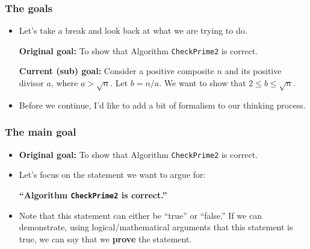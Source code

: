\begin{frame}\frametitle{The goals}
  \begin{itemize}
  \item Let's take a break and look back at what we are trying to do.
    \pause

    \begin{tcolorbox}
      {\bf Original goal:} To show that Algorithm {\tt CheckPrime2} is
      correct.
    \end{tcolorbox}
    \pause
    
    \begin{tcolorbox}
      {\bf Current (sub) goal:} Consider a positive composite $n$ and
      its positive divisor $a$, where $a>\sqrt{n}$.  Let $b=n/a$.  We
      want to show that $2\leq b\leq\sqrt{n}$.
    \end{tcolorbox}
    \pause

  \item Before we continue, I'd like to add a bit of formalism to our
    thinking process.
  \end{itemize}
\end{frame}

\begin{frame}\frametitle{The main goal}
  \begin{itemize}
  \item {\bf Original goal:} To show that Algorithm {\tt CheckPrime2}
    is correct.  \pause
  \item Let's focus on the statement we want to argue for:
    
    \begin{tcolorbox}
      {\bf ``Algorithm {\tt CheckPrime2} is correct.''}
    \end{tcolorbox}

    \pause
  \item
    Note that this statement can either be ``true'' or ``false.''  If
    we can demonstrate, using logical/mathematical arguments that this
    statement is true, we can say that we {\bf prove} the statement.
  \end{itemize}
\end{frame}

